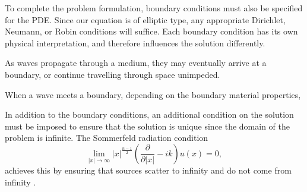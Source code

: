To complete the problem formulation, boundary conditions must also be specified for the PDE.
Since our equation is of elliptic type, any appropriate Dirichlet, Neumann, or Robin conditions will suffice.
Each boundary condition has its own physical interpretation, and therefore influences the solution differently.

As waves propagate through a medium, they may eventually arrive at a boundary, or continue travelling through space unimpeded.


When a wave meets a boundary, depending on the boundary material properties, 










In addition to the boundary conditions, an additional condition on the solution must be imposed to ensure that the solution is unique since the domain of the problem is infinite.
The Sommerfeld radiation condition
\[
\lim_{|x|\rightarrow \infty} |x|^{\frac{n-1}{2}} \left( \frac{\partial}{\partial |x|} - ik \right) u(x) = 0, \label{eqn:sommerfeld}
\]
achieves this by ensuring that sources scatter to infinity and do not come from infinity \cite{sommerfeld}.


